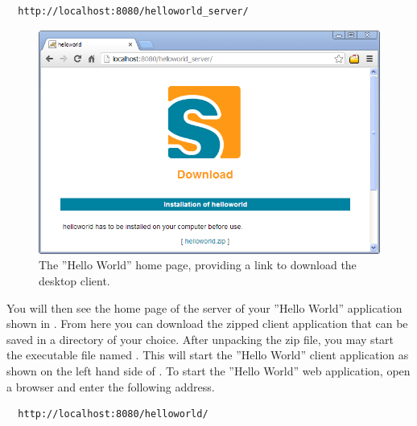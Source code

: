 \documentclass[a4paper,10pt,twoside]{book}
\begin{document}
\begin{lstlisting}
  http://localhost:8080/helloworld_server/
\end{lstlisting}

\begin{figure}
\includegraphics[width=12cm]{tomcat_helloworld_download.png}
\caption{The ''Hello World'' home page, providing a link to download the desktop client.}
\end{figure}

You will then see the home page of the server of your ''Hello World'' application shown in .
From here you can download the zipped client application that can be saved in a directory of your choice.
After unpacking the zip file, you may start the executable file named .
This will start the ''Hello World'' client application as shown on the left hand side of .
To start the ''Hello World'' web application, open a browser and enter the following address.

\begin{lstlisting}
  http://localhost:8080/helloworld/
\end{lstlisting}
\end{document}
